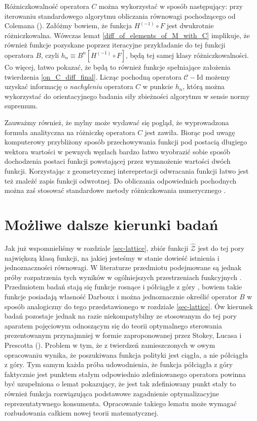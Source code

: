 	Różniczkowalność operatora $C$ można wykorzystać w sposób następujący: przy iterowaniu standardowego algorytmu obliczania równowagi pochodzącego od Colemana (\citeyear{Coleman1}). Załóżmy bowiem, że funkcja $H^{(-1)}\circ F$ jest dwukrotnie różniczkowalna. Wówczas lemat \ref{diff_of_elements_of_M_with_C} implikuje, że również funkcje pozyskane poprzez iteracyjne przykładanie do tej funkcji operatora $B$, czyli $h_n \equiv B^{n}[H^{(-1)}\circ F]$, będą tej samej klasy różniczkowalności. Co więcej, łatwo pokazać, że będą to również funkcje spełniające założenia twierdzenia \ref{on_C_diff_final}. Licząc pochodną operatora $\mathcal{C} - \mathrm{Id}$ możemy uzyskać informację o {\it nachyleniu} operatora $C$ w punkcie $h_n$, którą można wykorzystać do orientacyjnego badania siły zbieżności algorytmu w sensie normy supremum.  
	
	Zauważmy również, że mylny może wydawać się pogląd, że wyprowadzona formuła analityczna na różniczkę operatora $C$ jest zawiła. Biorąc pod uwagę komputerowy przybliżony sposób przechowywania funkcji pod postacią długiego wektora wartości w pewnych węzłach bardzo łatwo wyobrazić sobie sposób dochodzenia postaci funkcji powstającej przez wymnożenie wartości dwóch funkcji. Korzystając z geometrycznej interepretacji odwracania funkcji łatwo jest też znaleźć zapis funkcji odwrotnej. Do obliczania odpowiednich pochodnych można zaś stosować standardowe metody różniczkowania numerycznego \citep[zobacz:][str.447]{Kincaid}.
		
\section*{Możliwe dalsze kierunki badań}

Jak już wspomnieliśmy w rozdziale \ref{sec-lattice}, zbiór funkcji $\hat{\mathcal{Z}}$ jest do tej pory największą klasą funkcji, na jakiej jesteśmy w stanie dowieść istnienia i jednoznaczności równowagi. W literaturze przedmiotu podejmowane są jednak próby rozpatrzenia tych wyników w ogólniejszych przestrzeniach funkcyjnych \citep[patrz:][]{Reffett}. Przedmiotem badań stają się funkcje rosnące i półciągłe z góry \citep[patrz:][\S 6, IV. 28]{Bourbaki_1971}, bowiem takie funkcje posiadają własność Darboux \citep[patrz:][]{Guillerme_1995} i można jednoznacznie określić operator $B$ w sposób analogiczny do tego przedstawionego w rozdziale \ref{sec-lattice}. Ów kierunek badań pozostaje jednak na razie niekompatybilny ze stosowanym do tej pory aparatem pojęciowym odnoszącym się do teorii optymalnego sterowania prezentowanym przynajmniej w formie zaproponowanej przez Stokey, Lucasa i Prescotta (\citeyear[][]{Prescott}). Problem w tym, że z twierdzeń zamieszczonych w owym opracowaniu wynika, że poszukiwana funkcja polityki jest ciągła, a nie półciągła z góry. Tym samym każda próba udowodnienia, że funkcja półciągła z góry faktycznie jest punktem stałym odpowiednio zdefiniowanego operatora powinna być uzupełniona o lemat pokazujący, że jest tak zdefiniowany punkt stały to również funkcja rozwiązująca podstawowe zagadnienie optymalizacyjne reprezentatywnego konsumenta. Opracowanie takiego lematu może wymagać rozbudowania całkiem nowej teorii matematycznej.
 

